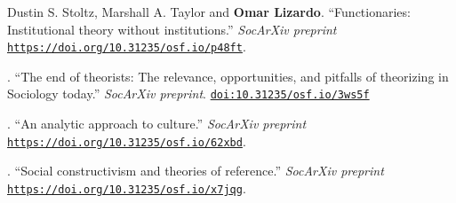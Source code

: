 \ind Dustin S. Stoltz, Marshall A. Taylor and {\bf Omar Lizardo}. ``Functionaries: Institutional theory without institutions.'' {\em SocArXiv preprint} \href{https://doi.org/10.31235/osf.io/p48ft}{\nolinkurl{https://doi.org/10.31235/osf.io/p48ft}}.

. ``The end of theorists: The relevance, opportunities, and pitfalls of theorizing in Sociology today.'' {\em SocArXiv preprint}. \href{https://doi.org/10.31235/osf.io/3ws5f}{\nolinkurl{doi:10.31235/osf.io/3ws5f}}

. ``An analytic approach to culture.'' {\em SocArXiv preprint} \href{https://doi.org/10.31235/osf.io/62xbd}{\nolinkurl{https://doi.org/10.31235/osf.io/62xbd}}.

. ``Social constructivism and theories of reference.'' {\em SocArXiv preprint} \href{https://doi.org/10.31235/osf.io/x7jqg}{\nolinkurl{https://doi.org/10.31235/osf.io/x7jqg}}.
